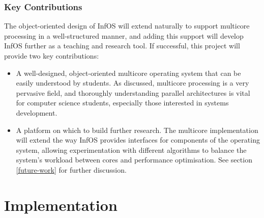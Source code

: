 \documentclass[bsc,frontabs,twoside,singlespacing,parskip,deptreport]{infthesis}     %
\begin{document}
\subsection{Key Contributions} \label{key-contributions}
The object-oriented design of InfOS will extend naturally to support multicore processing in a well-structured manner, and adding this support will develop InfOS further as a teaching and research tool. If successful, this project will provide two key contributions:

\begin{itemize}
    \item A well-designed, object-oriented multicore operating system that can be easily understood by students. As discussed, multicore processing is a very pervasive field, and thoroughly understanding parallel architectures is vital for computer science students, especially those interested in systems development.
    \item A platform on which to build further research. The multicore implementation will extend the way InfOS provides interfaces for components of the operating system, allowing experimentation with different algorithms to balance the system's workload between cores and performance optimisation. See section \ref{future-work} for further discussion.
\end{itemize}

\chapter{Implementation} \label{implementation}
\end{document}
